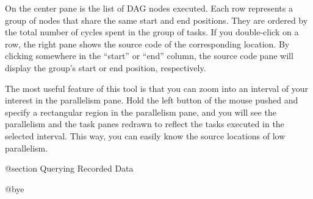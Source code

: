 On the center pane is the list of DAG nodes executed.  Each row
represents a group of nodes that share the same start and end positions.
They are ordered by the total number of cycles spent in the group of
tasks.  If you double-click on a row, the right pane shows the source
code of the corresponding location.  By clicking somewhere in the
``start'' or ``end'' column, the source code pane will display the
group's start or end position, respectively.

The most useful feature of this tool is that you can zoom into an
interval of your interest in the parallelism pane.  Hold the left button
of the mouse pushed and specify a rectangular region in the parallelism
pane, and you will see the parallelism and the task panes redrawn to
reflect the tasks executed in the selected interval.  This way, you can
easily know the source locations of low parallelism.

@section Querying Recorded Data


@bye
                                   

